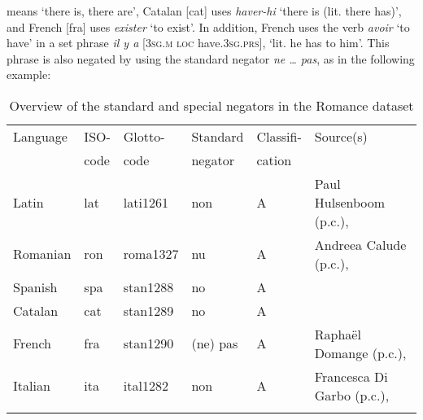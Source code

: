 \documentclass[output=paper,colorlinks,citecolor=brown]{langscibook}
\begin{document}
means `there is, there are', Catalan [cat] uses
\textit{haver-hi} `there is (lit. there has)', and French [fra]
uses \textit{exister} `to exist'. In addition, French uses the verb
\textit{avoir} `to have' in a set phrase \textit{il y a} [\textsc{3sg.m loc}
    have.\textsc{3sg.prs}], `lit. he has to him'. This phrase is also negated by using
the standard negator \textit{ne … pas}, as  in the following
example:
%
    \begin{exe}\end{exe}

\begin{table}\begin{small}
\caption{Overview of the standard and special negators in the Romance dataset}\label{tab:ieur-class-Romance}
\begin{tabularx}{\textwidth}{@{} l l l l l Q @{}}
\lsptoprule
{Language} & {ISO-} & {Glotto-} & {Standard} &
{Classifi-} & {Source(s)}\\
& {code} & {code} & {negator} & {cation} \\
\midrule
{Latin} & lat & lati1261 & non & A & Paul Hulsenboom (p.c.), \citet{GreenoughKittredge1903,Roby1862} \\
\tablevspace
{Romanian} & ron & roma1327 & nu & A & Andreea Calude (p.c.), \citet{Gonczol2008} \\
\tablevspace
{Spanish} & spa & stan1288 & no & A & \citet{ButtBenjamin1994} \\
\tablevspace
{Catalan} & cat & stan1289 & no & A & \citet{Hualde1992,WheelerYates1999} \\
\tablevspace
{French} & fra & stan1290 & (ne) pas & A & Raphaël Domange (p.c.), \citet{LangPerez2004,Offord2006} \\
\tablevspace
{Italian} & ita & ital1282 & non & A &   Francesca Di Garbo (p.c.),  \citet{PeyronelHiggins2006} \\
\lspbottomrule
\end{tabularx}
\end{small}\end{table}
\end{document}
